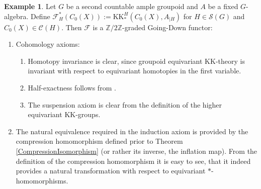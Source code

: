 \documentclass[reqno,oneside,a4paper,11pt]{amsart}
\theoremstyle{theorem}
\theoremstyle{definition}
\newtheorem{ex}[satz]{Example}
\newcommand{\ZZ}{\mathbb Z}
\begin{document}
	\begin{ex}\label{Example:Going-Down functor}
		Let $G$ be a second countable ample groupoid and $A$ be a fixed $G$-algebra. Define $\mathcal{F}_H^*(C_0(X)):=\mathrm{KK}^H_*(C_0(X),A_{\mid H})$ for $H\in\mathcal{S}(G)$ and $C_0(X)\in\mathcal{C}(H)$. Then $\mathcal{F}$ is a $\ZZ/2\ZZ$-graded Going-Down functor:
		\begin{enumerate}
			\item Cohomology axioms:
			\begin{enumerate}
				\item Homotopy invariance is clear, since groupoid equivariant $\mathrm{KK}$-theory is invariant with respect to equivariant homotopies in the first variable.
				\item Half-exactness follows from \cite[Proposition~7.2 and Lemma~7.7]{Tu99}.
				\item The suspension axiom is clear from the definition of the higher equivariant $\mathrm{KK}$-groups.
			\end{enumerate}
			\item The natural equivalence required in the induction axiom is provided by the compression homomorphism defined prior to Theorem \ref{CompressionIsomorphism} (or rather its inverse, the inflation map). From the definition of the compression homomorphism it is easy to see, that it indeed provides a natural transformation with respect to equivariant $\ast$-homomorphisms.
		\end{enumerate}
	\end{ex}
	
\end{document}
